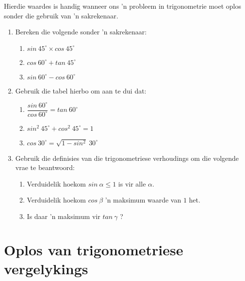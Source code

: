 \par
Hierdie waardes is handig wanneer ons 'n probleem in trigonometrie moet oplos sonder die gebruik van 'n sakrekenaar.\par 
\begin{exercises}{}
{
\begin{enumerate}[itemsep=6pt, label=\textbf{\arabic*}. ] 
\item Bereken die volgende sonder 'n sakrekenaar:
\begin{enumerate}[noitemsep, label=\textbf{(\alph*)} ]
\item $sin~45^{\circ} \times cos~45^{\circ}$
\item $cos~60^{\circ} + tan~45^{\circ}$
\item $sin~60^{\circ} - cos~60^{\circ}$
\end{enumerate}

\item Gebruik die tabel hierbo om aan te dui dat:
\begin{enumerate}[itemsep=5pt, label=\textbf{(\alph*)} ]
\item $\dfrac{sin~60^{\circ}}{cos~60^{\circ}} = tan~60^{\circ} $
\item $sin^{2}~45^{\circ}+ cos^{2}~45^{\circ} =1 $
\item $cos~30^{\circ} =\sqrt{1- sin^{2}}~30^{\circ}$
\end{enumerate}

\item Gebruik die definisies van die trigonometriese verhoudings om die volgende vrae te beantwoord:
\begin{enumerate}[noitemsep, label=\textbf{(\alph*)} ]
\item Verduidelik hoekom $sin~\alpha \leq 1$ is vir alle $\alpha$.
\item Verduidelik hoekom $cos~\beta$ 'n maksimum waarde van $1$ het.
\item Is daar 'n maksimum vir $tan~\gamma$ ?
\end{enumerate}
\end{enumerate}

}
\end{exercises}



\section{Oplos van trigonometriese vergelykings}

